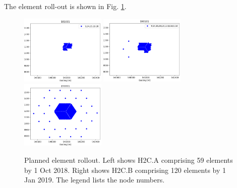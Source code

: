 \documentclass{article}
\begin{document}
The element roll-out is shown in Fig. \ref{Fig:rollout}.

\begin{figure}[H]
\includegraphics[width=0.36\textwidth]{cfg181001.png}
\includegraphics[width=0.36\textwidth]{cfg190101.png}
\includegraphics[width=0.36\textwidth]{ant_all.png}
\caption{Planned element rollout.  Left shows H2C.A comprising 59 elements by 1 Oct 2018.  Right shows H2C.B comprising 120 elements by 1 Jan 2019.  The legend lists the node numbers.}
\label{Fig:rollout}
\end{figure}
\end{document}
